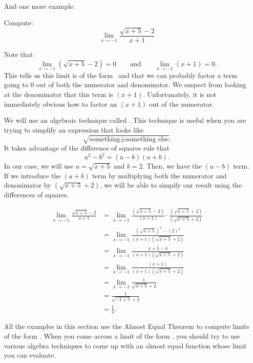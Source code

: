 \documentclass{ximera}
\begin{document}
And one more example:

\begin{example}
  Compute:
  \[
  \lim_{x\to-1} \frac{\sqrt{x+5}-2}{x+1}
  \]

\begin{explanation} 
  Note that 
  \[
  \lim_{x\to-1} \left(\sqrt{x+5}-2\right)=0\qquad\text{and}\qquad\lim_{x\to -1} \left(x+1\right) =0.
  \]
  This tells us this limit is of the form \zeroOverZero\ and that we
  can probably factor a term going to $0$ out of both the numerator
  and denominator.  We suspect from looking at the denominator that
  this term is $(x+1)$.  Unfortunately, it is not immediately obvious
  how to factor an $(x+1)$ out of the numerator.
 
  We will use an algebraic technique called .  This technique is useful when you are trying to
  simplify an expression that looks like
  \[
  \sqrt{\text{something} \pm \text{something else}}.
  \]
  It takes advantage of the difference of squares rule that
  \[
  a^2-b^2=(a-b)(a+b).
  \]
  In our case, we will use $a=\sqrt{x+5}$ and $b=2$.  Then, we have
  the $(a-b)$ term.  If we introduce the $(a+b)$ term by multiplying
  both the numerator and denonimator by $(\sqrt{x+5}+2)$, we will be
  able to simpify our result using the differences of squares.
 
\begin{align*}
\lim_{x\to-1} \frac{\sqrt{x+5}-2}{x+1}&=
\lim_{x\to-1} \frac{(\sqrt{x+5}-2)}{(x+1)} \cdot \frac{(\sqrt{x+5}+2)}{(\sqrt{x+5}+2)} \\
&=\lim_{x\to-1} \frac{(\sqrt{x+5})^2-(2)^2}{(x+1)(\sqrt{x+5}+2)} \\
&=\lim_{x\to-1} \frac{x+5-4}{(x+1)(\sqrt{x+5}+2)} \\
&=\lim_{x\to-1} \frac{(x+1)}{(x+1)(\sqrt{x+5}+2)} \\
&=\lim_{x\to-1} \frac{1}{\sqrt{x+5}+2}\\
&= \frac{1}{\sqrt{-1+5}+2}\\
&=\frac{1}{4}.
\end{align*}
\end{explanation}
\end{example}

All the examples in this section use the Almost Equal Theorem to
compute limits of the form \zeroOverZero.  When you come across a
limit of the form \zeroOverZero, you should try to use various algebra
techniques to come up with an almost equal function whose limit you
can evaluate.
\end{document}
